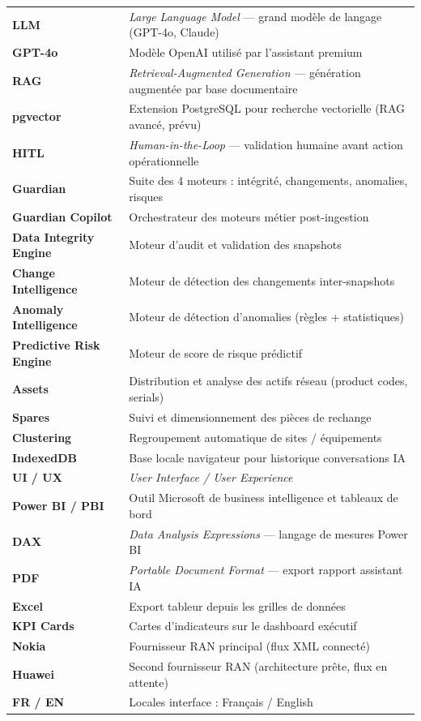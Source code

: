 \documentclass[12pt,a4paper]{report}
\begin{document}
\begin{longtable}{@{}p{3.4cm}p{10.3cm}@{}}
\textbf{LLM} & \textit{Large Language Model} — grand modèle de langage (GPT-4o, Claude) \\
\textbf{GPT-4o} & Modèle OpenAI utilisé par l'assistant premium \\
\textbf{RAG} & \textit{Retrieval-Augmented Generation} — génération augmentée par base documentaire \\
\textbf{pgvector} & Extension PostgreSQL pour recherche vectorielle (RAG avancé, prévu) \\
\textbf{HITL} & \textit{Human-in-the-Loop} — validation humaine avant action opérationnelle \\
\textbf{Guardian} & Suite des 4 moteurs : intégrité, changements, anomalies, risques \\
\textbf{Guardian Copilot} & Orchestrateur des moteurs métier post-ingestion \\
\textbf{Data Integrity Engine} & Moteur d'audit et validation des snapshots \\
\textbf{Change Intelligence} & Moteur de détection des changements inter-snapshots \\
\textbf{Anomaly Intelligence} & Moteur de détection d'anomalies (règles + statistiques) \\
\textbf{Predictive Risk Engine} & Moteur de score de risque prédictif \\
\textbf{Assets} & Distribution et analyse des actifs réseau (product codes, serials) \\
\textbf{Spares} & Suivi et dimensionnement des pièces de rechange \\
\textbf{Clustering} & Regroupement automatique de sites / équipements \\
\textbf{IndexedDB} & Base locale navigateur pour historique conversations IA \\
\textbf{UI / UX} & \textit{User Interface / User Experience} \\
\textbf{Power BI / PBI} & Outil Microsoft de business intelligence et tableaux de bord \\
\textbf{DAX} & \textit{Data Analysis Expressions} — langage de mesures Power BI \\
\textbf{PDF} & \textit{Portable Document Format} — export rapport assistant IA \\
\textbf{Excel} & Export tableur depuis les grilles de données \\
\textbf{KPI Cards} & Cartes d'indicateurs sur le dashboard exécutif \\
\textbf{Nokia} & Fournisseur RAN principal (flux XML connecté) \\
\textbf{Huawei} & Second fournisseur RAN (architecture prête, flux en attente) \\
\textbf{FR / EN} & Locales interface : Français / English \\
\end{longtable}
\normalsize
\clearpage
\end{document}

